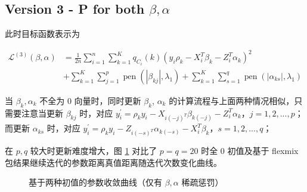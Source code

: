 \documentclass[12pt, a4paper, oneside]{article}
\numberwithin{equation}{section}
\begin{document}
\subsection{Version 3 - P for both $\beta,\alpha$}

此时目标函数表示为

\begin{equation}
	\begin{aligned}
		\mathcal{L}^{(3)}(\beta,\alpha)&=\frac{1}{2n}\sum_{i=1}^{n}\sum_{k=1}^{K} q_{C_i}(k)\left(y_i\rho_k - X_i^T \beta_k - Z_i^T \alpha_k \right)^2 \\
		&+ \sum_{k=1}^{K}\sum_{j=1}^{p} \operatorname{pen}\left(|\beta_{kj}|, \lambda_{1}\right) + \sum_{k=1}^{K}\sum_{s=1}^{q} \operatorname{pen}\left(|\alpha_{ks}|, \lambda_{1}\right) 
	\end{aligned}
\end{equation}

当 $\beta_k, \alpha_k$ 不全为 0 向量时，同时更新 $\beta_k$, $\alpha_k$ 的计算流程与上面两种情况相似，只需要注意当更新 $\beta_{kj}$ 时，对应 $y_i^\prime = \rho_k y_i - X_{i(-j)^T}\beta_{k(-j)} - Z_i^T\alpha_k$，$j=1,2,...,p$；而更新 $\alpha_{ks}$ 时，对应 $y_i^\prime = \rho_k y_i - Z_{i(-s)^T}\alpha_{k(-s)} - X_i^T\beta_k$，$s=1,2,...,q$；

在 $p, q$ 较大时更新难度增大，图 \ref{fig:compare-base} 对比了 $p=q=20$ 时全 0 初值及基于 flexmix 包结果继续迭代的参数距离真值距离随迭代次数变化曲线。

\begin{figure}
	\centering
	\caption{基于两种初值的参数收敛曲线（仅有 $\beta, \alpha$ 稀疏惩罚）}
	\label{fig:compare-base}
\end{figure}
\end{document}
